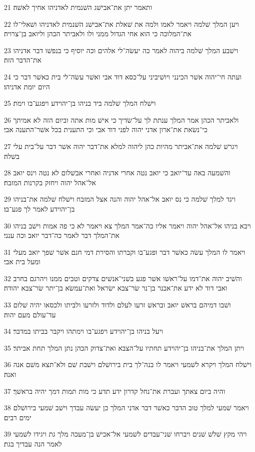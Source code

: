 \par 21 ותאמר יתן את־אבישׁג השׁנמית לאדניהו אחיך לאשׁה׃
\par 22 ויען המלך שׁלמה ויאמר לאמו ולמה את שׁאלת את־אבישׁג השׁנמית לאדניהו ושׁאלי־לו את־המלוכה כי הוא אחי הגדול ממני ולו ולאביתר הכהן וליואב בן־צרויה׃
\par 23 וישׁבע המלך שׁלמה ביהוה לאמר כה יעשׂה־לי אלהים וכה יוסיף כי בנפשׁו דבר אדניהו את־הדבר הזה׃
\par 24 ועתה חי־יהוה אשׁר הכינני ויושׁיביני על־כסא דוד אבי ואשׁר עשׂה־לי בית כאשׁר דבר כי היום יומת אדניהו׃
\par 25 וישׁלח המלך שׁלמה ביד בניהו בן־יהוידע ויפגע־בו וימת׃
\par 26 ולאביתר הכהן אמר המלך ענתת לך על־שׂדיך כי אישׁ מות אתה וביום הזה לא אמיתך כי־נשׂאת את־ארון אדני יהוה לפני דוד אבי וכי התענית בכל אשׁר־התענה אבי׃
\par 27 ויגרשׁ שׁלמה את־אביתר מהיות כהן ליהוה למלא את־דבר יהוה אשׁר דבר על־בית עלי בשׁלה׃
\par 28 והשׁמעה באה עד־יואב כי יואב נטה אחרי אדניה ואחרי אבשׁלום לא נטה וינס יואב אל־אהל יהוה ויחזק בקרנות המזבח׃
\par 29 ויגד למלך שׁלמה כי נס יואב אל־אהל יהוה והנה אצל המזבח וישׁלח שׁלמה את־בניהו בן־יהוידע לאמר לך פגע־בו׃
\par 30 ויבא בניהו אל־אהל יהוה ויאמר אליו כה־אמר המלך צא ויאמר לא כי פה אמות וישׁב בניהו את־המלך דבר לאמר כה־דבר יואב וכה ענני׃
\par 31 ויאמר לו המלך עשׂה כאשׁר דבר ופגע־בו וקברתו והסירת דמי חנם אשׁר שׁפך יואב מעלי ומעל בית אבי׃
\par 32 והשׁיב יהוה את־דמו על־ראשׁו אשׁר פגע בשׁני־אנשׁים צדקים וטבים ממנו ויהרגם בחרב ואבי דוד לא ידע את־אבנר בן־נר שׂר־צבא ישׂראל ואת־עמשׂא בן־יתר שׂר־צבא יהודה׃
\par 33 ושׁבו דמיהם בראשׁ יואב ובראשׁ זרעו לעלם ולדוד ולזרעו ולביתו ולכסאו יהיה שׁלום עד־עולם מעם יהוה׃
\par 34 ויעל בניהו בן־יהוידע ויפגע־בו וימתהו ויקבר בביתו במדבר׃
\par 35 ויתן המלך את־בניהו בן־יהוידע תחתיו על־הצבא ואת־צדוק הכהן נתן המלך תחת אביתר׃
\par 36 וישׁלח המלך ויקרא לשׁמעי ויאמר לו בנה־לך בית בירושׁלם וישׁבת שׁם ולא־תצא משׁם אנה ואנה׃
\par 37 והיה ביום צאתך ועברת את־נחל קדרון ידע תדע כי מות תמות דמך יהיה בראשׁך׃
\par 38 ויאמר שׁמעי למלך טוב הדבר כאשׁר דבר אדני המלך כן יעשׂה עבדך וישׁב שׁמעי בירושׁלם ימים רבים׃
\par 39 ויהי מקץ שׁלשׁ שׁנים ויברחו שׁני־עבדים לשׁמעי אל־אכישׁ בן־מעכה מלך גת ויגידו לשׁמעי לאמר הנה עבדיך בגת׃
